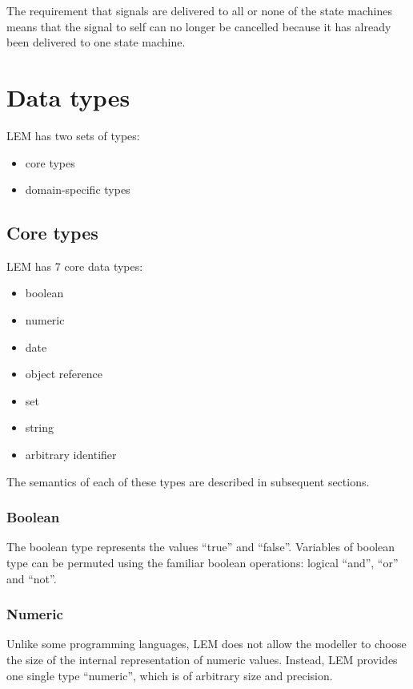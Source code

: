 The requirement that signals are delivered to all or none of the state
machines means that the signal to self can no longer be cancelled because
it has already been delivered to one state machine.

\section{Data types}
\label{section:coreDataTypes}

LEM has two sets of types:
\begin{itemize}
	\item core types
	\item domain-specific types
\end{itemize}

\subsection{Core types}

LEM has 7 core data types:

\begin{itemize}
        \item boolean
        \item numeric
        \item date
        \item object reference
        \item set
        \item string
        \item arbitrary identifier
\end{itemize}

The semantics of each of these types are described in subsequent sections.

\subsubsection{Boolean}

The boolean type represents the values ``true'' and ``false''. Variables of
boolean type can be permuted using the familiar boolean operations: logical
``and'', ``or'' and ``not''.

\subsubsection{Numeric}

Unlike some programming languages, LEM does not allow the modeller to choose the
size of the internal representation of numeric values. Instead, LEM provides one
single type ``numeric'', which is of arbitrary size and precision.

